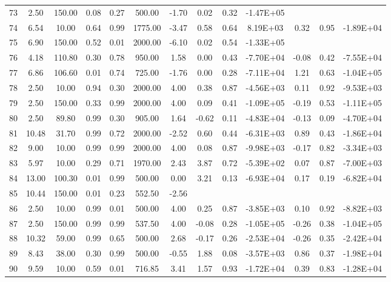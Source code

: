 \begin{landscape}
\begin{center}
\begin{longtable}{|c|c|c|c|c|c|c|c|c|c|c|c|c|}
73  & 2.50  & 150.00 & 0.08 & 0.27 & 500.00  & -1.70 & 0.02  & 0.32 & -1.47E+05 &       &      &           \\
74  & 6.54  & 10.00  & 0.64 & 0.99 & 1775.00 & -3.47 & 0.58  & 0.64 & 8.19E+03  & 0.32  & 0.95 & -1.89E+04 \\
75  & 6.90  & 150.00 & 0.52 & 0.01 & 2000.00 & -6.10 & 0.02  & 0.54 & -1.33E+05 &   &  &  \\
76  & 4.18  & 110.80 & 0.30 & 0.78 & 950.00  & 1.58  & 0.00  & 0.43 & -7.70E+04 & -0.08 & 0.42 & -7.55E+04 \\
77  & 6.86  & 106.60 & 0.01 & 0.74 & 725.00  & -1.76 & 0.00  & 0.28 & -7.11E+04 & 1.21  & 0.63 & -1.04E+05 \\
78  & 2.50  & 10.00  & 0.94 & 0.30 & 2000.00 & 4.00  & 0.38  & 0.87 & -4.56E+03 & 0.11  & 0.92 & -9.53E+03 \\
79  & 2.50  & 150.00 & 0.33 & 0.99 & 2000.00 & 4.00  & 0.09  & 0.41 & -1.09E+05 & -0.19 & 0.53 & -1.11E+05 \\
80  & 2.50  & 89.80  & 0.99 & 0.30 & 905.00  & 1.64  & -0.62 & 0.11 & -4.83E+04 & -0.13 & 0.09 & -4.70E+04 \\
81  & 10.48 & 31.70  & 0.99 & 0.72 & 2000.00 & -2.52 & 0.60  & 0.44 & -6.31E+03 & 0.89  & 0.43 & -1.86E+04 \\
82  & 9.00  & 10.00  & 0.99 & 0.99 & 2000.00 & 4.00  & 0.08  & 0.87 & -9.98E+03 & -0.17 & 0.82 & -3.34E+03 \\
83  & 5.97  & 10.00  & 0.29 & 0.71 & 1970.00 & 2.43  & 3.87  & 0.72 & -5.39E+02 & 0.07  & 0.87 & -7.00E+03 \\
84  & 13.00 & 100.30 & 0.01 & 0.99 & 500.00  & 0.00  & 3.21  & 0.13 & -6.93E+04 & 0.17  & 0.19 & -6.82E+04 \\
85  & 10.44 & 150.00 & 0.01 & 0.23 & 552.50  & -2.56 &       &      &           &       &      &           \\
86  & 2.50  & 10.00  & 0.99 & 0.01 & 500.00  & 4.00  & 0.25  & 0.87 & -3.85E+03 & 0.10  & 0.92 & -8.82E+03 \\
87  & 2.50  & 150.00 & 0.99 & 0.99 & 537.50  & 4.00  & -0.08 & 0.28 & -1.05E+05 & -0.26 & 0.38 & -1.04E+05 \\
88  & 10.32 & 59.00  & 0.99 & 0.65 & 500.00  & 2.68  & -0.17 & 0.26 & -2.53E+04 & -0.26 & 0.35 & -2.42E+04 \\
89  & 8.43  & 38.00  & 0.30 & 0.99 & 500.00  & -0.55 & 1.88  & 0.08 & -3.57E+03 & 0.86  & 0.37 & -1.98E+04 \\
90  & 9.59  & 10.00  & 0.59 & 0.01 & 716.85  & 3.41  & 1.57  & 0.93 & -1.72E+04 & 0.39  & 0.83 & -1.28E+04 \\

\end{longtable}
\end{center}
\end{landscape}
